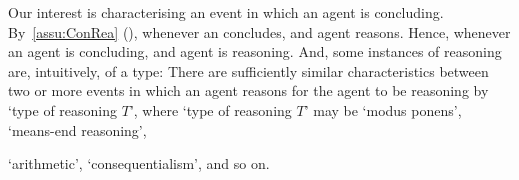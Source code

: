 \begin{note}
  Our interest is characterising an event in which an agent is concluding.
  By~\autoref{assu:ConRea} (), whenever an concludes, and agent reasons.
  Hence, whenever an agent is concluding, and agent is reasoning.
  And, some instances of reasoning are, intuitively, of a type:
  There are sufficiently similar characteristics between two or more events in which an agent reasons for the agent to be reasoning by `type of reasoning \(T\)', where `type of reasoning \(T\)' may be `modus ponens', `means-end reasoning',%





  `arithmetic', `consequentialism', and so on.



\end{note}

